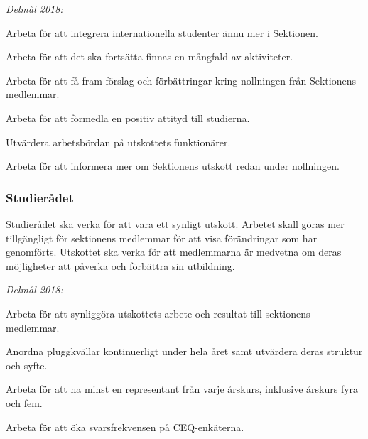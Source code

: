\documentclass[../_main/handlingar.tex]{subfiles}
\begin{document}
\emph{Delmål 2018:}
\begin{dashlist}
	\item Arbeta för att integrera internationella studenter ännu mer i Sektionen.
	\item Arbeta för att det ska fortsätta finnas en mångfald av aktiviteter.
	\item Arbeta för att få fram förslag och förbättringar kring nollningen från Sektionens medlemmar.
	\item Arbeta för att förmedla en positiv attityd till studierna.
	\item Utvärdera arbetsbördan på utskottets funktionärer.
	\item Arbeta för att informera mer om Sektionens utskott redan under nollningen.
\end{dashlist}

\subsubsection*{Studierådet}
Studierådet ska verka för att vara ett synligt utskott. Arbetet skall göras mer tillgängligt för sektionens medlemmar för att visa förändringar som har genomförts. Utskottet ska verka för att medlemmarna är medvetna om deras möjligheter att påverka och förbättra sin utbildning.

\emph{Delmål 2018:}
\begin{dashlist}
	\item Arbeta för att synliggöra utskottets arbete och resultat till sektionens medlemmar.
	\item Anordna pluggkvällar kontinuerligt under hela året samt utvärdera deras struktur och syfte.
	\item Arbeta för att ha minst en representant från varje årskurs, inklusive årskurs fyra och fem.
	\item Arbeta för att öka svarsfrekvensen på CEQ-enkäterna.
\end{dashlist}

\newpage
\end{document}
